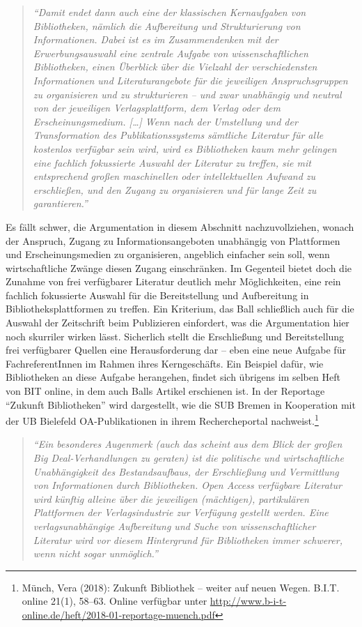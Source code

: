 \documentclass[a4paper,
fontsize=11pt,
oneside,
numbers=noperiodatend,
parskip=half-,
bibliography=totoc,
final
]{scrartcl}
\begin{document}
\begin{quote}
\emph{\enquote{Damit endet dann auch eine der klassischen Kernaufgaben
von Bibliotheken, nämlich die Aufbereitung und Strukturierung von
Informationen. Dabei ist es im Zusammendenken mit der Erwerbungsauswahl
eine zentrale Aufgabe von wissenschaftlichen Bibliotheken, einen
Überblick über die Vielzahl der verschiedensten Informationen und
Literaturangebote für die jeweiligen Anspruchsgruppen zu organisieren
und zu strukturieren -- und zwar unabhängig und neutral von der
jeweiligen Verlagsplattform, dem Verlag oder dem Erscheinungsmedium.
{[}\ldots{}{]} Wenn nach der Umstellung und der Transformation des
Publikationssystems sämtliche Literatur für alle kostenlos verfügbar
sein wird, wird es Bibliotheken kaum mehr gelingen eine fachlich
fokussierte Auswahl der Literatur zu treffen, sie mit entsprechend
großen maschinellen oder intellektuellen Aufwand zu erschließen, und den
Zugang zu organisieren und für lange Zeit zu garantieren.}}
\end{quote}

Es fällt schwer, die Argumentation in diesem Abschnitt nachzuvollziehen,
wonach der Anspruch, Zugang zu Informationsangeboten unabhängig von
Plattformen und Erscheinungsmedien zu organisieren, angeblich einfacher
sein soll, wenn wirtschaftliche Zwänge diesen Zugang einschränken. Im
Gegenteil bietet doch die Zunahme von frei verfügbarer Literatur
deutlich mehr Möglichkeiten, eine rein fachlich fokussierte Auswahl für
die Bereitstellung und Aufbereitung in Bibliotheksplattformen zu
treffen. Ein Kriterium, das Ball schließlich auch für die Auswahl der
Zeitschrift beim Publizieren einfordert, was die Argumentation hier noch
skurriler wirken lässt. Sicherlich stellt die Erschließung und
Bereitstellung frei verfügbarer Quellen eine Herausforderung dar -- eben
eine neue Aufgabe für FachreferentInnen im Rahmen ihres Kerngeschäfts.
Ein Beispiel dafür, wie Bibliotheken an diese Aufgabe herangehen, findet
sich übrigens im selben Heft von BIT online, in dem auch Balls Artikel
erschienen ist. In der Reportage \enquote{Zukunft Bibliotheken} wird
dargestellt, wie die SUB Bremen in Kooperation mit der UB Bielefeld
OA-Publikationen in ihrem Rechercheportal nachweist.\footnote{Münch,
  Vera (2018): Zukunft Bibliothek -- weiter auf neuen Wegen. B.I.T.
  online 21(1), 58--63. Online verfügbar unter
  \url{http://www.b-i-t-online.de/heft/2018-01-reportage-muench.pdf}}

\begin{quote}
\emph{\enquote{Ein besonderes Augenmerk (auch das scheint aus dem Blick
der großen Big Deal-Verhandlungen zu geraten) ist die politische und
wirtschaftliche Unabhängigkeit des Bestandsaufbaus, der Erschließung und
Vermittlung von Informationen durch Bibliotheken. Open Access verfügbare
Literatur wird künftig alleine über die jeweiligen (mächtigen),
partikulären Plattformen der Verlagsindustrie zur Verfügung gestellt
werden. Eine verlagsunabhängige Aufbereitung und Suche von
wissenschaftlicher Literatur wird vor diesem Hintergrund für
Bibliotheken immer schwerer, wenn nicht sogar unmöglich.}}
\end{quote}
\end{document}
